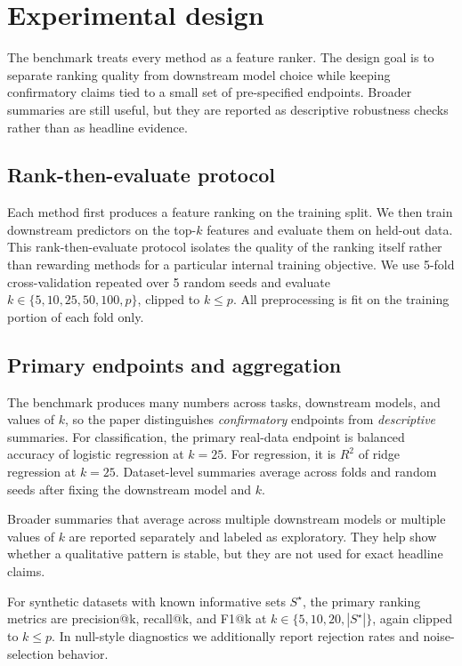 \section{Experimental design}
\label{sec:experiments}

The benchmark treats every method as a feature ranker. The design goal is to
separate ranking quality from downstream model choice while keeping
confirmatory claims tied to a small set of pre-specified endpoints. Broader
summaries are still useful, but they are reported as descriptive robustness
checks rather than as headline evidence.

\subsection{Rank-then-evaluate protocol}
\label{sec:experiments-protocol}

Each method first produces a feature ranking on the training split. We then
train downstream predictors on the top-$k$ features and evaluate them on
held-out data. This rank-then-evaluate protocol isolates the quality of the
ranking itself rather than rewarding methods for a particular internal
training objective. We use 5-fold cross-validation repeated over 5 random
seeds and evaluate $k \in \{5,10,25,50,100,p\}$, clipped to $k \le p$. All
preprocessing is fit on the training portion of each fold only.

\subsection{Primary endpoints and aggregation}
\label{sec:experiments-analysis-plan}

The benchmark produces many numbers across tasks, downstream models, and
values of $k$, so the paper distinguishes \emph{confirmatory} endpoints from
\emph{descriptive} summaries. For classification, the primary real-data
endpoint is balanced accuracy of logistic regression at $k=25$. For
regression, it is $R^2$ of ridge regression at $k=25$. Dataset-level
summaries average across folds and random seeds after fixing the downstream
model and $k$.

Broader summaries that average across multiple downstream models or multiple
values of $k$ are reported separately and labeled as exploratory. They help
show whether a qualitative pattern is stable, but they are not used for exact
headline claims.

For synthetic datasets with known informative sets $S^\star$, the primary
ranking metrics are precision@k, recall@k, and F1@k at
$k \in \{5,10,20,|S^\star|\}$, again clipped to $k \le p$. In null-style
diagnostics we additionally report rejection rates and noise-selection
behavior.

